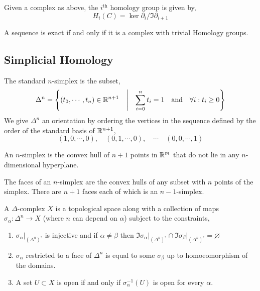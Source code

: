 \documentclass[12pt]{extarticle}
\begin{document}
\begin{definition}
Given a complex as above, the $i^{\mathrm{th}}$ homology group is given by,
\[ H_i(C) = \ker{\partial_i} / \Im{\partial_{i+1}} \]
\end{definition}

\begin{lemma}
A sequence is exact if and only if it is a complex with trivial Homology groups.
\end{lemma}

\subsection{Simplicial Homology}

\begin{definition}
The standard $n$-simplex is the subset,
\[\Delta^n = \left\{ (t_0, \cdots, t_n) \in \mathbb{R}^{n+1} \quad \middle| \quad \sum_{i = 0}^n t_i = 1 \quad \text{and} \quad \forall i : t_i \ge 0 \right\} \] 
We give $\Delta^n$ an orientation by ordering the vertices in the sequence defined by the order of the standard basis of $\mathbb{R}^{n+1}$,
\[(1,0, \cdots, 0), \quad (0,1,\cdots,0), \quad \cdots \quad (0, 0, \cdots, 1)\]
\end{definition}

\begin{definition}
An $n$-simplex is the convex hull of $n + 1$ points in $\mathbb{R}^m$ that do not lie in any $n$-dimensional hyperplane. 
\end{definition}

\begin{definition}
The faces of an $n$-simplex are the convex hulls of any subset with $n$ points of the simplex. There are $n+1$ faces each of which is an $n-1$-simplex. 
\end{definition}

\begin{definition}
A $\Delta$-complex $X$ is a topological space along with a collection of maps $\sigma_\alpha : \Delta^n \to X$ (where $n$ can depend on $\alpha$) subject to the constraints,
\begin{enumerate}
\item $\sigma_\alpha|_{(\Delta^n)^\circ}$ is injective and if $\alpha \neq \beta$ then $\Im{\sigma_\alpha|_{(\Delta^n)^\circ}} \cap \Im{\sigma_\beta|_{(\Delta^n)^\circ}} = \varnothing$

\item $\sigma_\alpha$ restricted to a face of $\Delta^n$ is equal to some $\sigma_\beta$ up to homoeomorphism of the domains. 

\item A set $U \subset X$ is open if and only if $\sigma_\alpha^{-1}(U)$ is open for every $\alpha$. 
\end{enumerate}
\end{definition}
\end{document}
